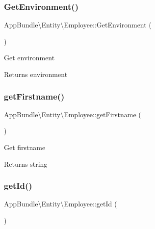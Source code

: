 \subsubsection{\texorpdfstring{Get\+Environment()}{GetEnvironment()}}
{\footnotesize\ttfamily App\+Bundle\textbackslash{}\+Entity\textbackslash{}\+Employee\+::\+Get\+Environment (\begin{DoxyParamCaption}{ }\end{DoxyParamCaption})}

Get environment

\begin{DoxyReturn}{Returns}
environment 
\end{DoxyReturn}
\mbox{\label{class_app_bundle_1_1_entity_1_1_employee_a113700e4ca507530c4d36f9dd9b3e1f8}} 
\subsubsection{\texorpdfstring{get\+Firstname()}{getFirstname()}}
{\footnotesize\ttfamily App\+Bundle\textbackslash{}\+Entity\textbackslash{}\+Employee\+::get\+Firstname (\begin{DoxyParamCaption}{ }\end{DoxyParamCaption})}

Get firstname

\begin{DoxyReturn}{Returns}
string 
\end{DoxyReturn}
\mbox{\label{class_app_bundle_1_1_entity_1_1_employee_a8a71f05623bc36531c265d4687907530}} 
\subsubsection{\texorpdfstring{get\+Id()}{getId()}}
{\footnotesize\ttfamily App\+Bundle\textbackslash{}\+Entity\textbackslash{}\+Employee\+::get\+Id (\begin{DoxyParamCaption}{ }\end{DoxyParamCaption})}

